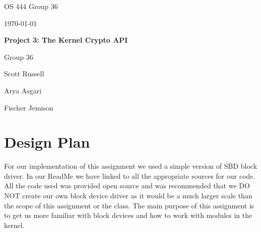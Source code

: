 \documentclass[onecolumn, draftclsnofoot,10pt, compsoc]{IEEEtran}
\def \GroupMemberOne{			Scott Russell}
\def \GroupMemberTwo{			Arya Asgari}
\def \GroupMemberThree{			Fischer Jemison}
\def \CapstoneProjectName{Project 3: The Kernel Crypto API  }
\def \DocType{	
				}
\begin{document}
\begin{titlepage}
    \begin{singlespace}
        \hfill 
        \par\vspace{.2in}
        \centering
        \scshape{
            \huge OS 444 Group 36 \DocType \par
            {\large\today}\par
            \vspace{.5in}
            \textbf{\Huge\CapstoneProjectName}\par
          
           \vfill
            
          
            \vspace{5pt}
       
            {\large Group 36 }\par
    
         \vspace{5pt}
            {\Large
                \par{\GroupMemberOne}\par
               {\GroupMemberTwo}\par
               {\GroupMemberThree}\par
            }
            \vspace{20pt}
    
            

            \vspace{5pt}
        }     
    \end{singlespace}
\end{titlepage}
\newpage
{}
\tableofcontents
\clearpage


\section{Design Plan}
For our implementation of this assignment we used a simple version of SBD block driver. In our ReadMe we have linked to all the appropriate sources for our code. All the code used was provided open source and was recommended that we DO NOT create our own block device driver as it would be a much larger scale than the scope of this assignment or the class. The main purpose of this assignment is to get us more familiar with block devices and how to work with modules in the kernel.
\end{document}
